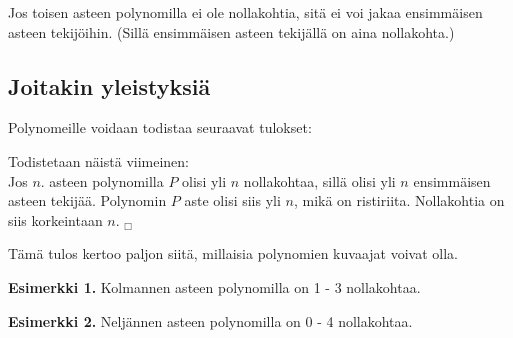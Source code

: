 Jos toisen asteen polynomilla ei ole nollakohtia, sitä ei voi jakaa ensimmäisen asteen tekijöihin. (Sillä ensimmäisen asteen tekijällä on aina nollakohta.)

\subsection*{Joitakin yleistyksiä}

Polynomeille voidaan todistaa seuraavat tulokset:

Todistetaan näistä viimeinen: \\
Jos $n$. asteen polynomilla $P$ olisi yli $n$ nollakohtaa, sillä olisi yli $n$ ensimmäisen asteen
tekijää. Polynomin $P$ aste olisi siis yli $n$, mikä on ristiriita. Nollakohtia on siis
korkeintaan $n$. $_\Box$

Tämä tulos kertoo paljon siitä, millaisia polynomien kuvaajat voivat olla.

\textbf{Esimerkki 1.} Kolmannen asteen polynomilla on 1 - 3 nollakohtaa.

\begin{lukusuora}{-2.5}{3}{3}
\end{lukusuora}
\begin{lukusuora}{-2.8}{2.5}{3}
\end{lukusuora}
\begin{lukusuora}{-2}{2}{3}
\end{lukusuora}

\textbf{Esimerkki 2.} Neljännen asteen polynomilla on 0 - 4 nollakohtaa.

\begin{lukusuora}{-4}{4}{3}
\end{lukusuora}
\begin{lukusuora}{-4}{4}{3}
\end{lukusuora}
\begin{lukusuora}{-4}{4}{3}
\end{lukusuora}

